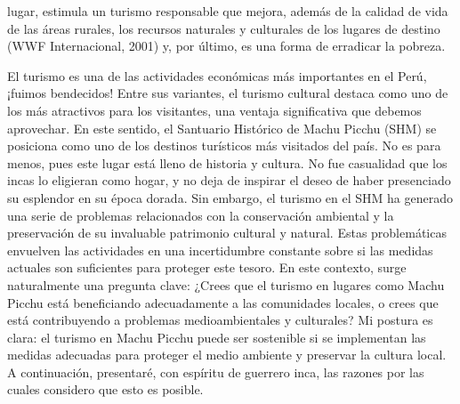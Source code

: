 \documentclass{article}
\begin{document}
lugar, estimula un turismo responsable que mejora, además de la calidad de vida de las áreas rurales, los recursos naturales y culturales de los lugares de destino (WWF Internacional, 2001) y, por último, es una forma de erradicar la pobreza.



El turismo es una de las actividades económicas más importantes en el Perú, ¡fuimos bendecidos! Entre sus variantes, el turismo cultural destaca como uno de los más atractivos para los visitantes, una ventaja significativa que debemos aprovechar. En este sentido, el Santuario Histórico de Machu Picchu (SHM) se posiciona como uno de los destinos turísticos más visitados del país. No es para menos, pues este lugar está lleno de historia y cultura. No fue casualidad que los incas lo eligieran como hogar, y no deja de inspirar el deseo de haber presenciado su esplendor en su época dorada. Sin embargo, el turismo en el SHM ha generado una serie de problemas relacionados con la conservación ambiental y la preservación de su invaluable patrimonio cultural y natural. Estas problemáticas envuelven las actividades en una incertidumbre constante sobre si las medidas actuales son suficientes para proteger este tesoro. En este contexto, surge naturalmente una pregunta clave: ¿Crees que el turismo en lugares como Machu Picchu está beneficiando adecuadamente a las comunidades locales, o crees que está contribuyendo a problemas medioambientales y culturales? Mi postura es clara: el turismo en Machu Picchu puede ser sostenible si se implementan las medidas adecuadas para proteger el medio ambiente y preservar la cultura local. A continuación, presentaré, con espíritu de guerrero inca, las razones por las cuales considero que esto es posible.
\end{document}
